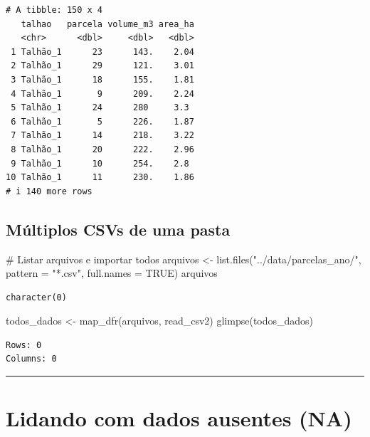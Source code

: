 \documentclass[
  letterpaper,
]{scrbook}
\newenvironment{Shaded}{\begin{snugshade}}{\end{snugshade}}
\newcommand{\AttributeTok}[1]{\textcolor[rgb]{0.40,0.45,0.13}{#1}}
\newcommand{\CommentTok}[1]{\textcolor[rgb]{0.37,0.37,0.37}{#1}}
\newcommand{\ConstantTok}[1]{\textcolor[rgb]{0.56,0.35,0.01}{#1}}
\newcommand{\FunctionTok}[1]{\textcolor[rgb]{0.28,0.35,0.67}{#1}}
\newcommand{\NormalTok}[1]{\textcolor[rgb]{0.00,0.23,0.31}{#1}}
\newcommand{\OtherTok}[1]{\textcolor[rgb]{0.00,0.23,0.31}{#1}}
\newcommand{\StringTok}[1]{\textcolor[rgb]{0.13,0.47,0.30}{#1}}
\begin{document}
\begin{verbatim}
# A tibble: 150 x 4
   talhao   parcela volume_m3 area_ha
   <chr>      <dbl>     <dbl>   <dbl>
 1 Talhão_1      23      143.    2.04
 2 Talhão_1      29      121.    3.01
 3 Talhão_1      18      155.    1.81
 4 Talhão_1       9      209.    2.24
 5 Talhão_1      24      280     3.3 
 6 Talhão_1       5      226.    1.87
 7 Talhão_1      14      218.    3.22
 8 Talhão_1      20      222.    2.96
 9 Talhão_1      10      254.    2.8 
10 Talhão_1      11      230.    1.86
# i 140 more rows
\end{verbatim}

\subsection{Múltiplos CSVs de uma
pasta}\label{muxfaltiplos-csvs-de-uma-pasta}

\begin{Shaded}
\begin{Highlighting}[]
\CommentTok{\# Listar arquivos e importar todos}
\NormalTok{arquivos }\OtherTok{\textless{}{-}} \FunctionTok{list.files}\NormalTok{(}\StringTok{"../data/parcelas\_ano/"}\NormalTok{, }\AttributeTok{pattern =} \StringTok{"*.csv"}\NormalTok{, }\AttributeTok{full.names =} \ConstantTok{TRUE}\NormalTok{)}
\NormalTok{arquivos}
\end{Highlighting}
\end{Shaded}

\begin{verbatim}
character(0)
\end{verbatim}

\begin{Shaded}
\begin{Highlighting}[]
\NormalTok{todos\_dados }\OtherTok{\textless{}{-}} \FunctionTok{map\_dfr}\NormalTok{(arquivos, read\_csv2)}
\FunctionTok{glimpse}\NormalTok{(todos\_dados)}
\end{Highlighting}
\end{Shaded}

\begin{verbatim}
Rows: 0
Columns: 0
\end{verbatim}

\begin{center}\rule{0.5\linewidth}{0.5pt}\end{center}

\section{Lidando com dados ausentes
(NA)}\label{lidando-com-dados-ausentes-na}
\end{document}
